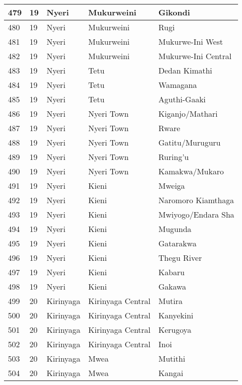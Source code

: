 \begin{table}[!ht]
\begin{tabular}{|l|l|l|l|l|}
        479 & 19 & Nyeri & Mukurweini & Gikondi \\ \hline
        480 & 19 & Nyeri & Mukurweini & Rugi \\ \hline
        481 & 19 & Nyeri & Mukurweini & Mukurwe-Ini West \\ \hline
        482 & 19 & Nyeri & Mukurweini & Mukurwe-Ini Central \\ \hline
        483 & 19 & Nyeri & Tetu & Dedan Kimathi \\ \hline
        484 & 19 & Nyeri & Tetu & Wamagana \\ \hline
        485 & 19 & Nyeri & Tetu & Aguthi-Gaaki \\ \hline
        486 & 19 & Nyeri & Nyeri Town & Kiganjo/Mathari \\ \hline
        487 & 19 & Nyeri & Nyeri Town & Rware \\ \hline
        488 & 19 & Nyeri & Nyeri Town & Gatitu/Muruguru \\ \hline
        489 & 19 & Nyeri & Nyeri Town & Ruring’u \\ \hline
        490 & 19 & Nyeri & Nyeri Town & Kamakwa/Mukaro \\ \hline
        491 & 19 & Nyeri & Kieni & Mweiga \\ \hline
        492 & 19 & Nyeri & Kieni & Naromoro Kiamthaga \\ \hline
        493 & 19 & Nyeri & Kieni & Mwiyogo/Endara Sha \\ \hline
        494 & 19 & Nyeri & Kieni & Mugunda \\ \hline
        495 & 19 & Nyeri & Kieni & Gatarakwa \\ \hline
        496 & 19 & Nyeri & Kieni & Thegu River \\ \hline
        497 & 19 & Nyeri & Kieni & Kabaru \\ \hline
        498 & 19 & Nyeri & Kieni & Gakawa \\ \hline
        499 & 20 & Kirinyaga & Kirinyaga Central & Mutira \\ \hline
        500 & 20 & Kirinyaga & Kirinyaga Central & Kanyekini \\ \hline
        501 & 20 & Kirinyaga & Kirinyaga Central & Kerugoya \\ \hline
        502 & 20 & Kirinyaga & Kirinyaga Central & Inoi \\ \hline
        503 & 20 & Kirinyaga & Mwea & Mutithi \\ \hline
        504 & 20 & Kirinyaga & Mwea & Kangai \\ \hline

\end{tabular}
\end{table}
